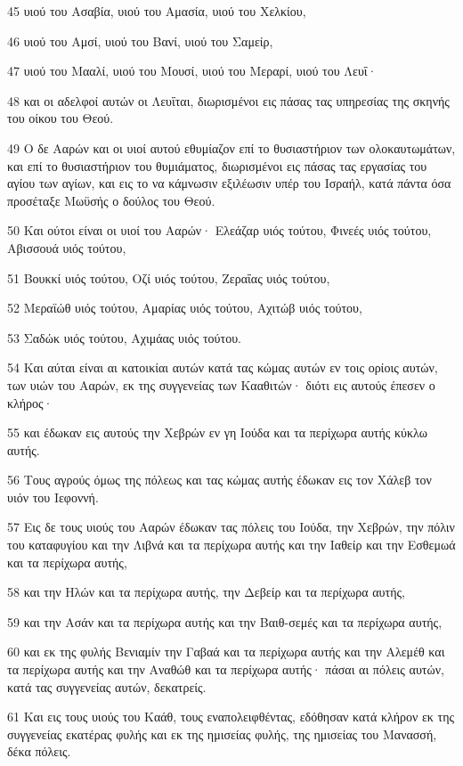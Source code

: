 \par 45 υιού του Ασαβία, υιού του Αμασία, υιού του Χελκίου,
\par 46 υιού του Αμσί, υιού του Βανί, υιού του Σαμείρ,
\par 47 υιού του Μααλί, υιού του Μουσί, υιού του Μεραρί, υιού του Λευΐ·
\par 48 και οι αδελφοί αυτών οι Λευΐται, διωρισμένοι εις πάσας τας υπηρεσίας της σκηνής του οίκου του Θεού.
\par 49 Ο δε Ααρών και οι υιοί αυτού εθυμίαζον επί το θυσιαστήριον των ολοκαυτωμάτων, και επί το θυσιαστήριον του θυμιάματος, διωρισμένοι εις πάσας τας εργασίας του αγίου των αγίων, και εις το να κάμνωσιν εξιλέωσιν υπέρ του Ισραήλ, κατά πάντα όσα προσέταξε Μωϋσής ο δούλος του Θεού.
\par 50 Και ούτοι είναι οι υιοί του Ααρών· Ελεάζαρ υιός τούτου, Φινεές υιός τούτου, Αβισσουά υιός τούτου,
\par 51 Βουκκί υιός τούτου, Οζί υιός τούτου, Ζεραΐας υιός τούτου,
\par 52 Μεραϊώθ υιός τούτου, Αμαρίας υιός τούτου, Αχιτώβ υιός τούτου,
\par 53 Σαδώκ υιός τούτου, Αχιμάας υιός τούτου.
\par 54 Και αύται είναι αι κατοικίαι αυτών κατά τας κώμας αυτών εν τοις ορίοις αυτών, των υιών του Ααρών, εκ της συγγενείας των Κααθιτών· διότι εις αυτούς έπεσεν ο κλήρος·
\par 55 και έδωκαν εις αυτούς την Χεβρών εν γη Ιούδα και τα περίχωρα αυτής κύκλω αυτής.
\par 56 Τους αγρούς όμως της πόλεως και τας κώμας αυτής έδωκαν εις τον Χάλεβ τον υιόν του Ιεφοννή.
\par 57 Εις δε τους υιούς του Ααρών έδωκαν τας πόλεις του Ιούδα, την Χεβρών, την πόλιν του καταφυγίου και την Λιβνά και τα περίχωρα αυτής και την Ιαθείρ και την Εσθεμωά και τα περίχωρα αυτής,
\par 58 και την Ηλών και τα περίχωρα αυτής, την Δεβείρ και τα περίχωρα αυτής,
\par 59 και την Ασάν και τα περίχωρα αυτής και την Βαιθ-σεμές και τα περίχωρα αυτής,
\par 60 και εκ της φυλής Βενιαμίν την Γαβαά και τα περίχωρα αυτής και την Αλεμέθ και τα περίχωρα αυτής και την Αναθώθ και τα περίχωρα αυτής· πάσαι αι πόλεις αυτών, κατά τας συγγενείας αυτών, δεκατρείς.
\par 61 Και εις τους υιούς του Καάθ, τους εναπολειφθέντας, εδόθησαν κατά κλήρον εκ της συγγενείας εκατέρας φυλής και εκ της ημισείας φυλής, της ημισείας του Μανασσή, δέκα πόλεις.

